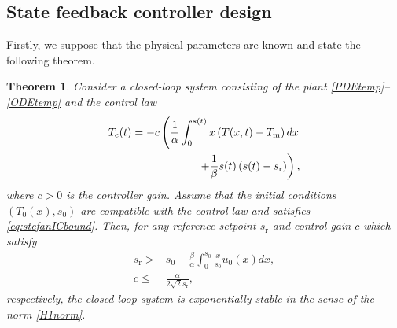 \documentclass[journal]{IEEEtran}
\newtheorem{thm}{Theorem}
\begin{document}
\subsection{State feedback controller design}
Firstly, we suppose that the physical parameters are known and  state the following theorem.
\begin{thm}\label{thm3}
Consider a closed-loop system consisting of the plant \eqref{PDEtemp}--\eqref{ODEtemp} and the control law
\begin{align}\label{tempcontrol}
T_{{\mathrm c}}(t)=-c \left(\frac{1}{\alpha} \int_{0}^{s(t)} x\left(T(x,t)-T_{{\mathrm m}}\right) dx\right.\notag \\
\left. +\frac{1}{\beta}s(t) \left(s(t)-s_{{\mathrm r}}\right)\right), 
\end{align}
where $c>0$ is the controller gain. Assume that the initial conditions $(T_0(x), s_0)$ are compatible with the control law and satisfies \eqref{eq:stefanICbound}. Then, for any reference setpoint  $s_{{\mathrm r}} $ and control gain $c$ which satisfy 
\begin{align}\label{temprestriction}
s_{{\mathrm r}} >& s_0 + \frac{\beta}{\alpha} \int_{0}^{s_0} \frac{x}{s_0}u_0(x) dx, \\
\label{tempgainrest}c \leq& \frac{\alpha}{2\sqrt{2}s_{{\mathrm r}} }, 
\end{align}
respectively, the closed-loop system is exponentially stable in the sense of the norm \eqref{H1norm}.
\end{thm}
\end{document}
